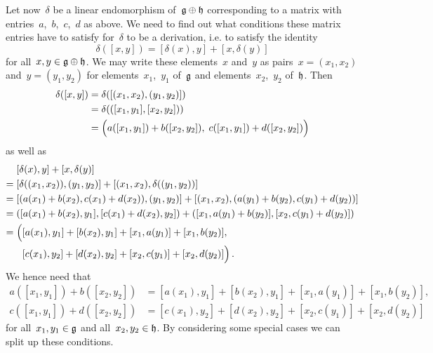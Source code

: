 \begin{example}
	Let now~$\delta$ be a linear endomorphism of~$\mathfrak{g} \oplus \mathfrak{h}$ corresponding to a matrix with entries~$a$,~$b$,~$c$,~$d$ as above.
	We need to find out what conditions these matrix entries have to satisfy for~$\delta$ to be a derivation, i.e. to satisfy the identity
	\begin{equation}
		\label{condition for derivation}
		\delta( [x,y] )
		=
		[ \delta(x), y ] + [ x, \delta(y) ]
	\end{equation}
	for all~$x, y \in \mathfrak{g} \oplus \mathfrak{h}$.
	We may write these elements~$x$ and~$y$ as pairs~$x = (x_1, x_2)$ and~$y = (y_1, y_2)$ for elements~$x_1$,~$y_1$ of~$\mathfrak{g}$ and elements~$x_2$,~$y_2$ of~$\mathfrak{h}$.
	Then
	\begin{align*}
		\delta( [x, y] )
		&=
		\delta( [ (x_1, x_2), (y_1, y_2) ] )
		\\
		&=
		\delta( ( [x_1, y_1], [x_2, y_2] ) )
		\\
		&=
		\Bigl(
			a( [x_1, y_1] ) + b( [x_2, y_2] ) , \;
			c( [x_1, y_1] ) + d( [x_2, y_2] )
		\Bigr)
	\end{align*}
	as well as
	\begin{align*}
		{}&
		[ \delta(x), y ] + [ x, \delta(y) ]
		\\
		={}&
		[ \delta( (x_1, x_2) ), (y_1, y_2) ]
		+ [ (x_1, x_2), \delta( (y_1, y_2) ) ]
		\\
		={}&
		[ ( a(x_1) + b(x_2), c(x_1) + d(x_2) ) , (y_1, y_2) ]
		+ [ (x_1, x_2), ( a(y_1) + b(y_2), c(y_1) + d(y_2) ) ]
		\\
		={}&
		( [ a(x_1) + b(x_2), y_1 ], [ c(x_1) + d(x_2), y_2 ] )
		+ ( [ x_1, a(y_1) + b(y_2) ] , [ x_2, c(y_1) + d(y_2) ] )
		\\
		={}&
		\Bigl(
			[ a(x_1), y_1 ] + [ b(x_2), y_1 ] + [ x_1, a(y_1) ] + [ x_1, b(y_2) ] ,
		\\
		{}&
		\phantom{ \Bigl( }
			[ c(x_1), y_2 ] + [ d(x_2), y_2 ] + [ x_2, c(y_1) ] + [ x_2, d(y_2) ]
		\Bigr) \,.
	\end{align*}
	We hence need that
	\begin{align*}
		a( [x_1, y_1] ) + b( [x_2, y_2] )
		&=
		[ a(x_1), y_1 ] + [ b(x_2), y_1 ] + [ x_1, a(y_1) ] + [ x_1, b(y_2) ] , \\
		c( [x_1, y_1] ) + d( [x_2, y_2] )
		&=
		[ c(x_1), y_2 ] + [ d(x_2), y_2 ] + [ x_2, c(y_1) ] + [ x_2, d(y_2) ]
	\end{align*}
	for all~$x_1, y_1 \in \mathfrak{g}$ and all~$x_2, y_2 \in \mathfrak{h}$.
	By considering some special cases we can split up these conditions.
	\begin{itemize}

\end{itemize}
\end{example}

